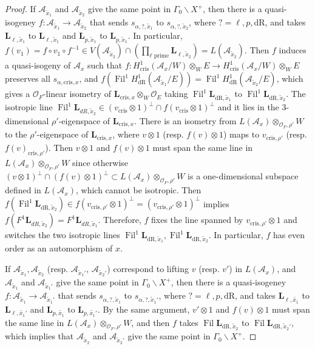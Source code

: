 \documentclass{amsart}
\numberwithin{equation}{subsection}
\numberwithin{theorem}{section}
\theoremstyle{definition}
\theoremstyle{remark}
\newcommand{\cA}{\mathcal{A}}
\newcommand{\cO}{\mathcal{O}}
\newcommand{\dR}{_{\mathrm{dR}}}
\newcommand{\cris}{_{\mathrm{cris}}}
\DeclareMathOperator{\Fil}{Fil}
\begin{document}
\begin{proof}
    If $\cA_{\tilde{x}_1}$ and $\cA_{\tilde{x}_2}$ give the same point in $\Gamma_0\backslash X^+$, then there is a quasi-isogeney $f: \cA_{\tilde{x}_1} \to \cA_{\tilde{x}_2}$ that sends $s_{\alpha, ?,\tilde{x}_1}$ to $s_{\alpha, ?,\tilde{x}_2}$, where $? = \ell, p, \mathrm{dR}$, and takes $\bm{L}_{\ell,\tilde{x}_1}$ to  $\bm{L}_{\ell,\tilde{x}_1}$ and $\bm{L}_{p,\tilde{x}_1}$ to  $\bm{L}_{p,\tilde{x}_1}$. In particular, $f(v_1) = f\circ v_1 \circ f^{-1} \in V(\cA_{\tilde{x}_2})\cap (\prod_{\ell \text{ prime}} \bm{L}_{\ell,\tilde{x}_2}) = L(\cA_{\tilde{x}_2})$. 
    Then $f$ induces a quasi-isogeny of $\mathcal{A}_{x}$ such that $f:H^1\cris(\mathcal{A}_{x}/W) \otimes_{W} E \to H^1\cris(\mathcal{A}_{x}/W)\otimes_{W} E$ preserves all $s_{\alpha, \mathrm{cris}, x}$,  and $f(\Fil^1 H^1\dR(\mathcal{A}_{\tilde{x}_1}/E)) = \Fil^1 H^1\dR(\mathcal{A}_{\tilde{x}_2}/E) $, 
    which gives a $\cO_F$-linear isometry of $\bm{L}_{\mathrm{cris}, x} \otimes_{W} \cO_E$ taking $\Fil^1 \bm{L}_{\mathrm{dR}, \tilde{x}_1}$ to $\Fil^1\bm{L}_{\mathrm{dR}, \tilde{x}_2}$.
    The isotropic line $\Fil^1\bm{L}_{dR, \tilde{x}_2} \in (v\cris \otimes 1)^{\perp} \cap f(v\cris\otimes 1)^{\perp}$ and it lies in the $3$-dimensional $\rho'$-eigenspace of $\bm{L}_{\mathrm{cris},x}$. There is an isometry from $L(\cA_x)\otimes_{\cO_F, \rho'} W$ to the $\rho'$-eigenspace of $\bm{L}_{\mathrm{cris},x}$, where $v\otimes 1$ (resp. $f(v)\otimes 1$) maps to $v_{\mathrm{cris},\rho'}$ (resp. $f(v)_{\mathrm{cris},\rho'}$). Then $v\otimes 1$ and $f(v)\otimes1$ must span the same line in $L(\cA_x)\otimes_{\cO_F, \rho'}W$ since otherwise $(v\otimes 1)^{\perp} \cap (f(v)\otimes 1)^{\perp} \subset L(\cA_x)\otimes_{\cO_F, \rho'}W$ is a one-dimensional subspace defined in $L(\cA_x)$, which cannot be isotropic.  Then $f (\Fil^1 \bm{L}_{\mathrm{dR}, \tilde{x}_2}) \in f(v_{\mathrm{cris},\rho'}\otimes1)^\perp = (v_{\mathrm{cris},\rho'}\otimes1)^{\perp}$ implies $f (F^1 \bm{L}_{dR, \tilde{x}_2}) = F^1 \bm{L}_{dR, \tilde{x}_1}$. Therefore, $f$ fixes the line spanned by $v_{\mathrm{cris},\rho'}\otimes 1$ and switches the two isotropic lines $\Fil^1 \bm{L}_{\mathrm{dR}, \tilde{x}_1}, 
    \Fil^1 \bm{L}_{\mathrm{dR}, \tilde{x}_2}$. In particular, $f$ has even order as an automorphism of $x$. 

    If $\cA_{\tilde{x}_1}, \cA_{\tilde{x}_2}$ (resp. $\cA_{\tilde{x}_1'}$, $\cA_{\tilde{x}_2'}$) correspond to lifting $v$ (resp. $v'$) in $L(\cA_x)$, and $\cA_{\tilde{x}_1}$ and $\cA_{\tilde{x}_1'}$ give the same point in $\Gamma_0\backslash X^+$, then there is a quasi-isogeney $f: \cA_{\tilde{x}_1} \to \cA_{\tilde{x}_1'}$ that sends $s_{\alpha, ?,\tilde{x}_1}$ to $s_{\alpha, ?,\tilde{x}_1'}$, where $? = \ell, p, \mathrm{dR}$, and takes $\bm{L}_{\ell, \tilde{x_1}}$ to $\bm{L}_{\ell, \tilde{x_1}'}$ and $\bm{L}_{p, \tilde{x_1}}$ to $\bm{L}_{p, \tilde{x_1}'}$. By the same argument, $v'\otimes 1$ and $f(v)\otimes 1$ must span the same line in $L(\cA_x)\otimes_{\cO_F, \rho'} W$, and then $f$ takes $\Fil\bm{L}_{\mathrm{dR}, \tilde{x}_2}$ to $\Fil\bm{L}_{\mathrm{dR}, \tilde{x}_2'}$, which implies that  $\cA_{\tilde{x}_2}$ and $\cA_{\tilde{x}_2'}$ give the same point in $\Gamma_0\backslash X^+$. 
\end{proof}
\end{document}
